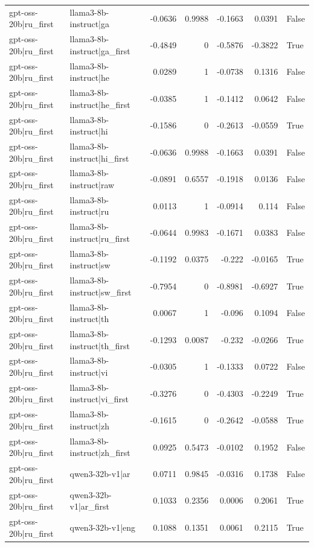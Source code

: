 \begin{table}
\begin{tabular}{l l r r r r l}
gpt-oss-20b|ru_first & llama3-8b-instruct|ga & -0.0636 & 0.9988 & -0.1663 & 0.0391 & False \\
gpt-oss-20b|ru_first & llama3-8b-instruct|ga_first & -0.4849 & 0 & -0.5876 & -0.3822 & True \\
gpt-oss-20b|ru_first & llama3-8b-instruct|he & 0.0289 & 1 & -0.0738 & 0.1316 & False \\
gpt-oss-20b|ru_first & llama3-8b-instruct|he_first & -0.0385 & 1 & -0.1412 & 0.0642 & False \\
gpt-oss-20b|ru_first & llama3-8b-instruct|hi & -0.1586 & 0 & -0.2613 & -0.0559 & True \\
gpt-oss-20b|ru_first & llama3-8b-instruct|hi_first & -0.0636 & 0.9988 & -0.1663 & 0.0391 & False \\
gpt-oss-20b|ru_first & llama3-8b-instruct|raw & -0.0891 & 0.6557 & -0.1918 & 0.0136 & False \\
gpt-oss-20b|ru_first & llama3-8b-instruct|ru & 0.0113 & 1 & -0.0914 & 0.114 & False \\
gpt-oss-20b|ru_first & llama3-8b-instruct|ru_first & -0.0644 & 0.9983 & -0.1671 & 0.0383 & False \\
gpt-oss-20b|ru_first & llama3-8b-instruct|sw & -0.1192 & 0.0375 & -0.222 & -0.0165 & True \\
gpt-oss-20b|ru_first & llama3-8b-instruct|sw_first & -0.7954 & 0 & -0.8981 & -0.6927 & True \\
gpt-oss-20b|ru_first & llama3-8b-instruct|th & 0.0067 & 1 & -0.096 & 0.1094 & False \\
gpt-oss-20b|ru_first & llama3-8b-instruct|th_first & -0.1293 & 0.0087 & -0.232 & -0.0266 & True \\
gpt-oss-20b|ru_first & llama3-8b-instruct|vi & -0.0305 & 1 & -0.1333 & 0.0722 & False \\
gpt-oss-20b|ru_first & llama3-8b-instruct|vi_first & -0.3276 & 0 & -0.4303 & -0.2249 & True \\
gpt-oss-20b|ru_first & llama3-8b-instruct|zh & -0.1615 & 0 & -0.2642 & -0.0588 & True \\
gpt-oss-20b|ru_first & llama3-8b-instruct|zh_first & 0.0925 & 0.5473 & -0.0102 & 0.1952 & False \\
gpt-oss-20b|ru_first & qwen3-32b-v1|ar & 0.0711 & 0.9845 & -0.0316 & 0.1738 & False \\
gpt-oss-20b|ru_first & qwen3-32b-v1|ar_first & 0.1033 & 0.2356 & 0.0006 & 0.2061 & True \\
gpt-oss-20b|ru_first & qwen3-32b-v1|eng & 0.1088 & 0.1351 & 0.0061 & 0.2115 & True \\

\end{tabular}
\end{table}

